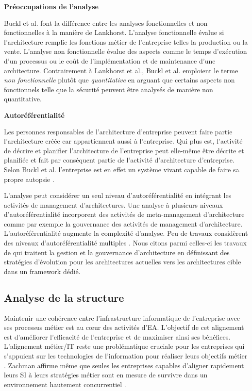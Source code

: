 \begin{description}
	\item \textbf{Préoccupations de l'analyse}

Buckl et al. font la différence entre les analyses fonctionnelles et non fonctionnelles à la manière de Lankhorst. L'analyse fonctionnelle évalue si l'architecture remplie les fonctions métier de l'entreprise telles la production ou la vente. L'analyse non fonctionnelle évalue des aspects comme le temps d'exécution d'un processus ou le coût de l'implémentation et de maintenance d'une architecture. Contrairement à Lankhorst et al., Buckl et al. emploient le terme \textit{non fonctionnelle} plutôt que \textit{quantitative} en arguant que certains aspects non fonctionnels telle que la sécurité peuvent être analysés de manière non quantitative.  

	\item \textbf{Autoréférentialité}
	
Les personnes responsables de l'architecture d'entreprise peuvent faire partie l'architecture créée car appartiennent aussi à l'entreprise. Qui plus est, l'activité de décrire et planifier l'architecture de l'entreprise peut elle-même être décrite et planifiée et fait par conséquent partie de l'activité d'architecture d'entreprise. Selon Buckl et al. \cite{varela1974autopoiesis} l'entreprise est en effet un système vivant capable de faire sa propre autopsie \cite{varela1974autopoiesis}.

L'analyse peut considérer un seul niveau d'autoréférentialité en intégrant les activités de management d'architectures. Une analyse à plusieurs niveaux d'autoréférentialité incorporent des activités de meta-management d'architecture comme par exemple la gouvernance des activités de management d'architecture.
L'autoréférentialité augmente la complexité d'analyse. Peu de travaux considèrent des niveaux d'autoréférentialité  multiples \cite{smook2014executable}. Nous citons parmi celles-ci les travaux de \cite{metrailler_evolis_2014} qui traitent la gestion et la gouvernance d'architecture en définissant des stratégies d'évolution pour les architectures actuelles vers les architectures cible dans un framework dédié. 

\end{description}

	\subsection{Analyse de la structure}
	Maintenir une cohérence entre l'infrastructure informatique de l'entreprise avec ses processus métier est au cœur des activités d'EA\cite{lankhorst2013enterprise}. L'objectif de cet alignement est d'améliorer l'efficacité de l'entreprise et de maximiser ainsi ses bénéfices. L'alignement métier/IT reste une problématique cruciale pour les entreprises qui s'appuient sur les technologies de l'information pour réaliser leurs objectifs métier \cite{kaisler_enterprise_2005}. Zachman affirme même que seules les entreprises capables d'aligner rapidement leurs SI à leurs stratégies métier sont en mesure de survivre dans un environnement hautement concurrentiel \cite{zachman1997enterprise}.
	
